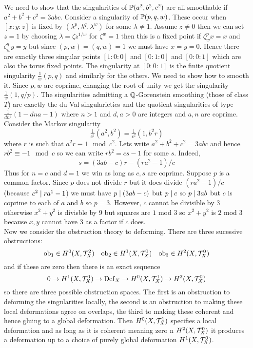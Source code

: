 \documentclass[12pt]{article}
\begin{document}
We need to show that the singularities of $\P(a^2, b^2, c^2)$ are all smoothable if $a^2 + b^2 + c^2 = 3 abc$. Consider a singularity of $\P(p,q,w)$. These occur when $[x : y : z]$ is fixed by $(\lambda^p, \lambda^q, \lambda^w)$ for some $\lambda \neq 1$. Assume $z \neq 0$ then we can set $z = 1$ by choosing $\lambda = \zeta z^{1/w}$ for $\zeta^w = 1$ then this is a fixed point if $\zeta_w^p x = x$ and $\zeta_w^q y = y$ but since $(p,w) = (q,w) = 1$ we must have $x = y = 0$. Hence there are exactly three singular points $[1:0:0]$ and $[0:1:0]$ and $[0:0:1]$ which are also the torus fixed points. The singularity at $[0:0:1]$ is the finite quotient singularity $\frac{1}{w}(p,q)$ and similarly for the others. We need to show how to smooth it. Since $p, w$ are coprime, changing the root of unity we get the singularity $\frac{1}{w}(1,q/p)$. The singularities admitting a $\Q$-Gorenstein smoothing (those of class $T$) are exactly the du Val singularieties and the quotient singularities of type $\frac{1}{d n^2}(1 - dna - 1)$ where $n > 1$ and $d,a > 0$ are integers and $a,n$ are coprime. Consider the Markov singularity
\[ \tfrac{1}{c^2} (a^2, b^2) = \tfrac{1}{c^2} (1, b^2 r) \]
where $r$ is such that $a^2 r \equiv 1 \mod c^2$. Lets write $a^2 + b^2 + c^2 = 3 abc$ and hence $r b^2 \equiv -1 \mod c$ so we can write $r b^2 = c s - 1$ for some $s$. Indeed,
\[ s = (3ab - c) r - (ra^2 - 1)/c \]
Thus for $n = c$ and $d = 1$ we win as long as $c, s$ are coprime. Suppose $p$ is a common factor. Since $p$ does not divide $r$ but it does divide $(ra^2 - 1)/c$ (because $c^2 \divides r a^1 - 1$) we must have $p \divides (3ab - c)$ but $p \divides c$ so $p \divides 3 ab$ but $c$ is coprime to each of $a$ and $b$ so $p = 3$. However, $c$ cannot be divisible by $3$ otherwise $x^2 + y^2$ is divisble by $9$ but squares are $1$ mod $3$ so $x^2 + y^2$ is $2$ mod $3$ because $x,y$ cannot have $3$ as a factor if $c$ does.
\bigskip\\   
Now we consider the obstruction theory to deforming. There are three sucessive obstructions:
\[ \ob_1 \in H^0(X, \T^2_X) \quad \ob_2 \in H^1(X, \T^1_X) \quad \ob_3 \in H^2(X, \T^0_X) \]
and if these are zero then there is an exact sequence
\[ 0 \to H^1(X, \T^0_X) \to \Def_X \to H^0(X, \T^1_X) \to H^2(X, \T^0_X) \]
so there are three possible obstruction spaces. The first is an obstruction to deforming the singularities locally, the second is an obstruction to making these local deformations agree on overlaps, the third to making these coherent and hence gluing to a global deformation. Then $H^0(X, \T^1_X)$ specifies a local deformation and as long as it is coherent meaning zero n $H^2(X, \T^0_X)$ it produces a deformation up to a choice of purely global deformation $H^1(X, \T^0_X)$. 
\end{document}
